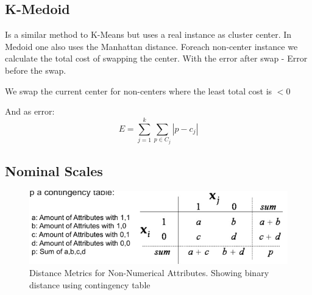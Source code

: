 \documentclass[../Main.tex]{subfiles}
\begin{document}
\subsection{K-Medoid}
Is a similar method to K-Means but uses a real instance as cluster center.
In Medoid one also uses the Manhattan distance.
Foreach non-center instance we calculate the total cost of swapping the center.
With the error after swap - Error before the swap.

We swap the current center for non-centers where the least total cost is \(< 0 \)

And as error:
\begin{equation}
    E = \sum_{j=1}^{k} \sum_{p \in C_j} |p - c_j|
\end{equation}

\subsection{Nominal Scales}


\begin{figure}[H]
    \centering
    \includegraphics[width=0.75\linewidth]{Images/datan/contingency-table.png}
    \caption{Distance Metrics for Non-Numerical Attributes. Showing binary distance using contingency table}
\end{figure}

\end{document}
